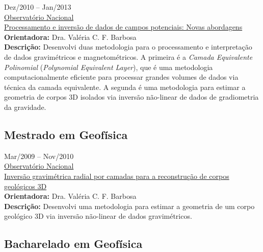 \faHourglassStart \quad Dez/2010 -- Jan/2013\\
\faInstitution \quad \href{http://www.on.br/index.php/pt-br/}{Observat{\'o}rio Nacional}\\
\faExternalLink \quad  \href{http://www.pinga-lab.org/thesis/oliveira-jr-phd.html}{Processamento e invers\~{a}o de dados de campos potenciais: Novas abordagens}\\
\textbf{Orientadora:} Dra. Valéria C. F. Barbosa \\
\textbf{Descrição:} Desenvolvi duas metodologia para o 
processamento e interpretação de dados gravimétricos e magnetométricos. A primeira é
a \textit{Camada Equivalente Polinomial} (\textit{Polynomial Equivalent Layer}), que 
é uma metodologia computacionalmente eficiente para processar grandes volumes de dados 
via técnica da camada equivalente. A segunda é uma metodologia para estimar a geometria 
de corpos 3D isolados via inversão não-linear de dados de gradiometria da gravidade.\\


\subsection*{Mestrado em Geof{\'i}sica}

\faHourglassStart \quad Mar/2009 -- Nov/2010\\
\faInstitution \quad \href{http://www.on.br/index.php/pt-br/}{Observat{\'o}rio Nacional}\\
\faExternalLink \quad  \href{http://www.pinga-lab.org/thesis/oliveira-jr-msc.html}{Invers{\~a}o gravim{\'e}trica radial por camadas para a reconstru{\c c}{\~a}o de corpos geol{\'o}gicos 3D}\\
\textbf{Orientadora:} Dra. Valéria C. F. Barbosa \\
\textbf{Descrição:} Desenvolvi uma metodologia para
estimar a geometria de um corpo geol{\'o}gico 3D via invers{\~a}o n{\~a}o-linear 
de dados gravimétricos.\\


\subsection*{Bacharelado em Geof{\'i}sica}


